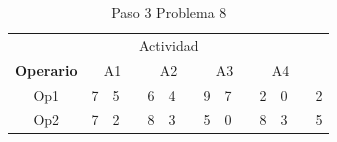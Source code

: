 \documentclass[12pt]{article}  %
\begin{document}
\begin{table}[H]
\centering
\caption{Paso 3 Problema 8}
\label{tab:Paso3Prob8}
\begin{tabular}{ccclcclcclcclc}
\multicolumn{14}{c}{Actividad}                                                                                                                                                                                                                                                                                                                                                                                                                                                                                                                                                                                                                                             \\ \cline{2-13}
\multicolumn{1}{c|}{\textbf{Operario}} & \multicolumn{3}{c|}{A1}                                                                                                                         & \multicolumn{3}{c|}{A2}                                                                                                                         & \multicolumn{3}{c|}{A3}                                                                                                                         & \multicolumn{3}{c|}{A4}                                                                                                                         & \multicolumn{1}{l}{}      \\ \cline{2-13}
\multicolumn{1}{c|}{Op1}               & \multicolumn{1}{c|}{\cellcolor[HTML]{67FD9A}7} & \multicolumn{1}{c|}{\cellcolor[HTML]{FFCC67}5} & \multicolumn{1}{l|}{\cellcolor[HTML]{FCFF2F}} & \multicolumn{1}{c|}{\cellcolor[HTML]{67FD9A}6} & \multicolumn{1}{c|}{\cellcolor[HTML]{FFCC67}4} & \multicolumn{1}{l|}{\cellcolor[HTML]{F8FF00}} & \multicolumn{1}{c|}{\cellcolor[HTML]{67FD9A}9} & \multicolumn{1}{c|}{\cellcolor[HTML]{FFCC67}7} & \multicolumn{1}{l|}{\cellcolor[HTML]{F8FF00}} & \multicolumn{1}{c|}{\cellcolor[HTML]{67FD9A}2} & \multicolumn{1}{c|}{\cellcolor[HTML]{FFC702}0} & \multicolumn{1}{l|}{\cellcolor[HTML]{F8FF00}} & \cellcolor[HTML]{FFCCC9}2 \\ \cline{2-13}
\multicolumn{1}{c|}{Op2}               & \multicolumn{1}{c|}{\cellcolor[HTML]{67FD9A}7} & \multicolumn{1}{c|}{\cellcolor[HTML]{FFCC67}2} & \multicolumn{1}{l|}{\cellcolor[HTML]{FCFF2F}} & \multicolumn{1}{c|}{\cellcolor[HTML]{67FD9A}8} & \multicolumn{1}{c|}{\cellcolor[HTML]{FFCC67}3} & \multicolumn{1}{l|}{\cellcolor[HTML]{F8FF00}} & \multicolumn{1}{c|}{\cellcolor[HTML]{67FD9A}5} & \multicolumn{1}{c|}{\cellcolor[HTML]{FFCC67}0} & \multicolumn{1}{l|}{\cellcolor[HTML]{F8FF00}} & \multicolumn{1}{c|}{\cellcolor[HTML]{67FD9A}8} & \multicolumn{1}{c|}{\cellcolor[HTML]{FFC702}3} & \multicolumn{1}{l|}{\cellcolor[HTML]{F8FF00}} & \cellcolor[HTML]{FFCCC9}5 \\ \cline{2-13}

\end{tabular}
\end{table}
\end{document}
